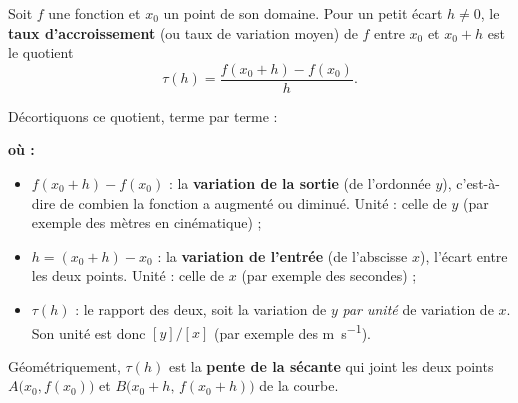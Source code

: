 \documentclass[11pt,a4paper]{article}
\newenvironment{ou}{%
  \par\smallskip\noindent\textbf{où :}\nopagebreak
  \begin{itemize}[leftmargin=1.8em,topsep=2pt,itemsep=1.5pt,parsep=0pt]}%
  {\end{itemize}}
\begin{document}
\begin{definition}
Soit $f$ une fonction et $x_0$ un point de son domaine. Pour un petit écart $h\neq 0$, le
\textbf{taux d'accroissement} (ou taux de variation moyen) de $f$ entre $x_0$ et $x_0+h$ est le
quotient
\[
   \tau(h)=\frac{f(x_0+h)-f(x_0)}{h}.
\]
\end{definition}

\noindent Décortiquons ce quotient, terme par terme :
\begin{ou}
  \item $f(x_0+h)-f(x_0)$ : la \textbf{variation de la sortie} (de l'ordonnée $y$), c'est-à-dire de
        combien la fonction a augmenté ou diminué. Unité : celle de $y$ (par exemple des mètres en cinématique) ;
  \item $h=(x_0+h)-x_0$ : la \textbf{variation de l'entrée} (de l'abscisse $x$), l'écart entre les deux
        points. Unité : celle de $x$ (par exemple des secondes) ;
  \item $\tau(h)$ : le rapport des deux, soit la variation de $y$ \emph{par unité} de variation de $x$.
        Son unité est donc $[y]/[x]$ (par exemple des \unit{\metre\per\second}).
\end{ou}

Géométriquement, $\tau(h)$ est la \textbf{pente de la sécante} qui joint les deux points
$A\big(x_0,f(x_0)\big)$ et $B\big(x_0+h,\,f(x_0+h)\big)$ de la courbe.
\end{document}
